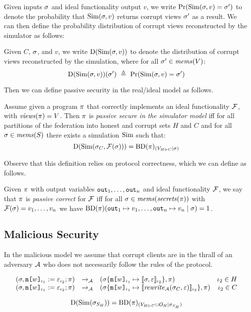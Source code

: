 Given inputs $\sigma$ and ideal
functionality output $v$, we write $ \mathrm{Pr}(\mathrm{Sim}(\sigma,v) = \sigma') $
to denote the probability that $\mathrm{Sim}(\sigma,v)$ returns corrupt views
$\sigma'$ as a result. We can then define the probability distribution
of corrupt views reconstructed by the simulator as follows:
\begin{definition}
  Given $C$, $\sigma$, and $v$, we write $\mathrm{D}(\mathrm{Sim}(\sigma,v))$ to
  denote the distribution of corrupt views reconstructed by the
  simulation, where for
  all $\sigma' \in \mathit{mems}(V)$:
  $$
  \dist(\SIM(\store,v))(\store')\ \defeq\ \prob(\SIM(\store,v) = \store') 
  $$
\end{definition}
Then we can define passive security in the real/ideal
model as follows. 
\begin{definition}
  Assume given a program $\pi$ that correctly implements an ideal
  functionality $\mathcal{F}$, with $\mathit{views}(\pi) = V$.  Then $\pi$
  is \emph{passive secure in the simulator model} iff for all
  partitions of the federation into honest and corrupt sets $H$ and $C$
  and for all $\sigma \in \mathit{mems}(S)$ there exists a
  simulation $\mathrm{Sim}$ such that:
  $$
  \mathrm{D}(\mathrm{Sim}(\sigma_{C},\mathcal{F}(\sigma))) = \mathrm{BD}(\pi)_{({V_{H \rhd C}}|{\sigma})}
  $$
\end{definition}
Observe that this definition relies on protocol correctness, which
we can define as follows.
\begin{definition}
  Given $\pi$ with output variables $\texttt{out}_{1},\ldots,\texttt{out}_{n}$ and ideal
  functionality $\mathcal{F}$, we say that $\pi$ is \emph{passive correct}
  for $\mathcal{F}$ iff for all $\sigma \in \mathit{mems}(\mathit{secrets}(\pi))$
  with $\mathcal{F}(\sigma) = v_1,\ldots,v_n$ we have
  $\mathrm{BD}(\pi)(\texttt{out}_{1} \mapsto v_1,\ldots,\texttt{out}_{n} \mapsto v_n \mid \sigma) = 1$.
\end{definition}

\subsection{Malicious Security}

In the malicious model we assume that corrupt clients are in the thrall of an
adversary $\mathcal{A}$ who does not necessarily follow the rules of the protocol.

$$
\begin{array}{rclr}
  (\sigma, \texttt{m[}w\texttt{]}_{\iota_1} := \varepsilon_{\iota_2};\pi) &\xrightarrow{}_{\mathcal{A}}&
  (\sigma\{\texttt{m[}w\texttt{]}_{\iota_1} \mapsto \llbracket \sigma,\varepsilon \rrbracket_{\iota_2}\}, \pi) & \iota_2 \in H\\
  (\sigma, \texttt{m[}w\texttt{]}_{\iota_1} := \varepsilon_{\iota_2};\pi) &\xrightarrow{}_{\mathcal{A}}&
  (\sigma\{\texttt{m[}w\texttt{]}_{\iota_1} \mapsto \llbracket \mathit{rewrite}_{\mathcal{A}}(\sigma_C,\varepsilon) \rrbracket_{\iota_2}\}, \pi) & \iota_2 \in C
\end{array}
$$


$$
\mathrm{D}(\mathrm{Sim}(\sigma_{S_H})) = \mathrm{BD}(\pi)_{({V_{H \rhd C} \cup O_H}|{\sigma_{S_H}})}
$$

